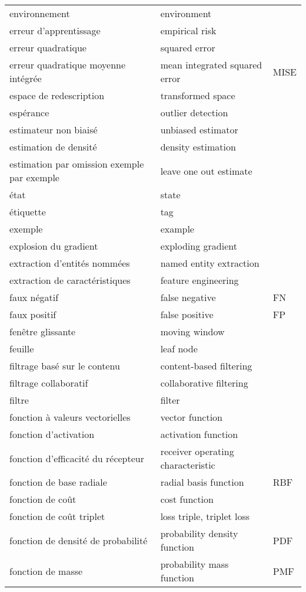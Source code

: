 \begin{longtable}{p{} p{} p{}}
environnement & environment &  \\ 
erreur d'apprentissage & empirical risk &  \\ 
erreur quadratique & squared error &  \\ 
erreur quadratique moyenne intégrée & mean integrated squared error & MISE \\ 
espace de redescription & transformed space &  \\ 
espérance & outlier detection &  \\ 
estimateur non biaisé & unbiased estimator &  \\ 
estimation de densité & density estimation &  \\ 
estimation par omission exemple par exemple & leave one out estimate &  \\ 
état & state &  \\ 
étiquette & tag &  \\ 
exemple & example &  \\ 
explosion du gradient & exploding gradient &  \\ 
extraction d’entités nommées & named entity extraction &  \\ 
extraction de caractéristiques & feature engineering &  \\ 
faux négatif & false negative & FN \\ 
faux positif & false positive & FP \\ 
fenêtre glissante & moving window &  \\ 
feuille & leaf node &  \\ 
filtrage basé sur le contenu & content-based filtering &  \\ 
filtrage collaboratif & collaborative filtering &  \\ 
filtre & filter &  \\ 
fonction à valeurs vectorielles & vector function &  \\ 
fonction d’activation & activation function &  \\ 
fonction d’efficacité du récepteur & receiver operating characteristic &  \\ 
fonction de base radiale & radial basis function & RBF \\ 
fonction de coût & cost function &  \\ 
fonction de coût triplet & loss triple, triplet loss &  \\ 
fonction de densité de probabilité & probability density function & PDF \\ 
fonction de masse & probability mass function & PMF \\ 

\end{longtable}
